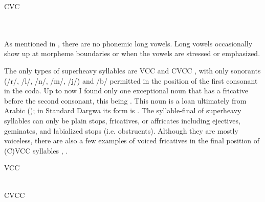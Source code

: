 \begin{exe}
\TabPositions{11em}
	\ex	CVC	\label{ex:syllable CVC phon} \\
		 	\tab 	{} 	\\
		 	\tab 	{} 	\\
		 	\tab 	{} 	
\end{exe}

As mentioned in , there are no phonemic long vowels. Long vowels occasionally show up at morpheme boundaries or when the vowels are stressed or emphasized.

The only types of superheavy syllables are VCC  and CVCC , with only sonorants (/r/, /l/, /n/, /m/, /j/) and /b/ permitted in the position of the first consonant in the coda. Up to now I found only one exceptional noun that has a fricative before the second consonant, this being  . This noun is a loan ultimately from Arabic (); in Standard Dargwa its form is . The syllable-final  of superheavy syllables can only be plain stops, fricatives, or affricates including ejectives, geminates, and labialized stops (i.e. obstruents). Although they are mostly voiceless, there are also a few examples of voiced fricatives in the final position of (C)VCC syllables , .
%
\begin{exe}
\TabPositions{13em}
	\ex	VCC	\label{ex:syllable VCC phon}\\
		 	\tab 		{} 	\\
		 	\tab 		{} 	
\end{exe}

\begin{exe}
\TabPositions{13em}
	\ex	CVCC	\label{ex:syllable CVCC phon}\\
		 	\tab 		{} 	\\
		  	\tab 		{} 	\\
		 	\tab 		{} 	\\
		 	\tab 		{} 	\\
		 	\tab 		{}  	\\
		 	\tab 		{} 	\\
		 	
\end{exe}
 

